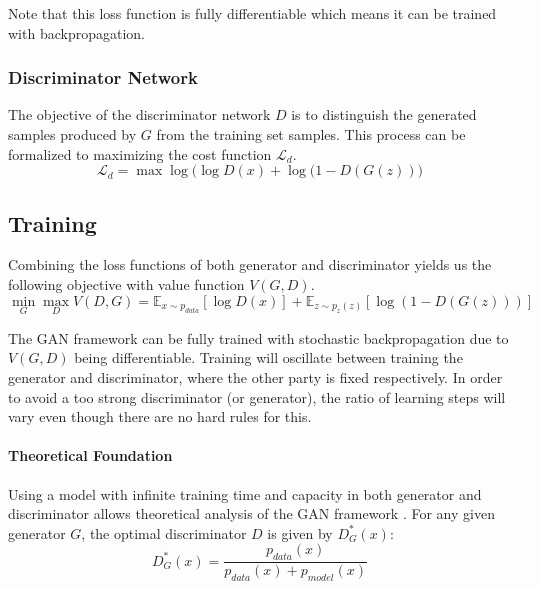 Note that this loss function is fully differentiable which means it can be trained with backpropagation.



\subsubsection{Discriminator Network}
The objective of the discriminator network $D$ is to distinguish the generated samples produced by $G$ from the training set samples.
This process can be formalized to maximizing the cost function $\mathcal{L}_d$.
$$
\mathcal{L}_d = \max \log\big(\log D(x) + \log (1 - D(G(z))\big)
$$



\subsection{Training}
\label{sub:gan_training}
Combining the loss functions of both generator and discriminator yields us the following objective with value function $V(G,D)$.
$$
\min_G \max_D V(D,G) = \mathbb{E}_{x \sim p_{data}}[\log D(x)] + \mathbb{E}_{z \sim p_z(z)}[\log(1 - D(G(z)))]
$$

The GAN framework can be fully trained with stochastic backpropagation due to $V(G,D)$ being differentiable.
Training will oscillate between training the generator and discriminator, where the other party is fixed respectively.
In order to avoid a too strong discriminator (or generator), the ratio of learning steps will vary even though there are no hard rules for this.

\paragraph{Theoretical Foundation}
Using a model with infinite training time and capacity in both generator and discriminator allows theoretical analysis of the GAN framework \cite{gan:2013}.
For any given generator $G$, the optimal discriminator $D$ is given by $D_G^*(x)$:
$$
D_G^*(x) = \frac{p_{data}(x)}{p_{data}(x) + p_{model}(x)}
$$


